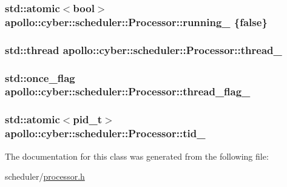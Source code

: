 \hypertarget{classapollo_1_1cyber_1_1scheduler_1_1Processor_a7d77fcdd037bb308488b6f2bdb135101}{
\subsubsection[{running\-\_\-}]{\setlength{\rightskip}{0pt plus 5cm}std\-::atomic$<$bool$>$ apollo\-::cyber\-::scheduler\-::\-Processor\-::running\-\_\- \{false\}\hspace{0.3cm}{\ttfamily [private]}}}\label{classapollo_1_1cyber_1_1scheduler_1_1Processor_a7d77fcdd037bb308488b6f2bdb135101}
\hypertarget{classapollo_1_1cyber_1_1scheduler_1_1Processor_a2a0aaa17f63537e1cf23676b2645fbf3}{
\subsubsection[{thread\-\_\-}]{\setlength{\rightskip}{0pt plus 5cm}std\-::thread apollo\-::cyber\-::scheduler\-::\-Processor\-::thread\-\_\-\hspace{0.3cm}{\ttfamily [private]}}}\label{classapollo_1_1cyber_1_1scheduler_1_1Processor_a2a0aaa17f63537e1cf23676b2645fbf3}
\hypertarget{classapollo_1_1cyber_1_1scheduler_1_1Processor_af8d792d6a520ca8a91e82e14026d1f62}{
\subsubsection[{thread\-\_\-flag\-\_\-}]{\setlength{\rightskip}{0pt plus 5cm}std\-::once\-\_\-flag apollo\-::cyber\-::scheduler\-::\-Processor\-::thread\-\_\-flag\-\_\-\hspace{0.3cm}{\ttfamily [private]}}}\label{classapollo_1_1cyber_1_1scheduler_1_1Processor_af8d792d6a520ca8a91e82e14026d1f62}
\hypertarget{classapollo_1_1cyber_1_1scheduler_1_1Processor_a6cdc919faf4daee51d13c77f07b79194}{
\subsubsection[{tid\-\_\-}]{\setlength{\rightskip}{0pt plus 5cm}std\-::atomic$<$pid\-\_\-t$>$ apollo\-::cyber\-::scheduler\-::\-Processor\-::tid\-\_\-\hspace{0.3cm}{\ttfamily [private]}}}\label{classapollo_1_1cyber_1_1scheduler_1_1Processor_a6cdc919faf4daee51d13c77f07b79194}


The documentation for this class was generated from the following file\-:\begin{DoxyCompactItemize}
\item 
scheduler/\hyperlink{processor_8h}{processor.\-h}\end{DoxyCompactItemize}
